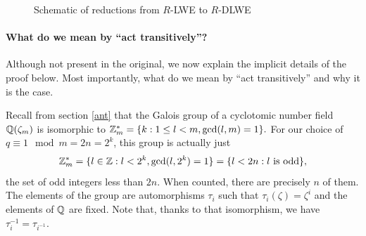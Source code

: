 \begin{figure}[ht]
	\center
{}
\caption{Schematic of reductions from $R$-LWE to $R$-DLWE}
\label{fig:4reds}
\end{figure}

\paragraph{What do we mean by ``act transitively''?}
Although not present in the original, we now explain the implicit details of the proof below. Most importantly, what do we mean by ``act transitively'' and why it is the case.

Recall from section \ref{ant} that the Galois group of a cyclotomic number field $\mathbb{Q}(\zeta_m)$ is isomorphic to $\mathbb{Z}_m^* = \{k: 1 \leq l < m, \gcd(l,m) = 1\}.$ For our choice of $q \equiv 1 \mod m = 2n = 2^k$, this group is actually just
\[ \mathbb{Z}_m^* = \{l \in \mathbb{Z} : l < 2^k, \gcd(l,2^k) = 1 \} = \{l < 2n: l \text{ is odd}\}, \]
the set of odd integers less than $2n$. When counted, there are precisely $n$ of them. The elements of the group are automorphisms $\tau_i$ such that $\tau_i(\zeta) = \zeta^i$ and the elements of $\mathbb{Q}$ are fixed. Note that, thanks to that isomorphism, we have $\tau_i^{-1} = \tau_{i^{-1}}$.

